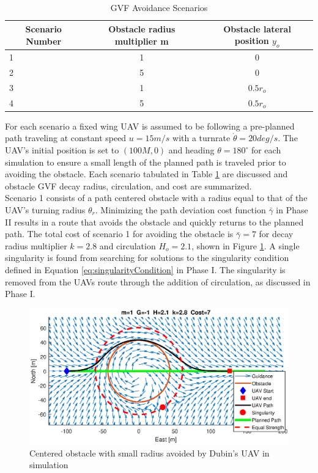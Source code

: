 \documentclass[numbered,pdftex]{ohio-etd}
\begin{document}
\begin{table}[]
	\centering
	\caption{GVF Avoidance Scenarios}
	\label{table:avoidanceScenarios}
	\begin{tabular}{|l|c|c|}
		\hline
		\multicolumn{1}{|c|}{Scenario Number} & Obstacle radius multiplier m & Obstacle lateral position $y_o$    \\ \hline
		1                                     & 1 & 0     \\ \hline
		2                                     & 5 & 0     \\ \hline
		3                                     & 1 & $0.5r_o$ \\ \hline
		4                                     & 5 & $0.5r_o$ \\ \hline
	\end{tabular}
\end{table}




For each scenario a fixed wing UAV is assumed to be following a pre-planned path traveling at constant speed $u=15m/s$ with a turnrate $\dot{\theta}=20 deg/s$. The UAV's initial position is set to $(100M,0)$ and heading $\theta = 180^\circ$ for each simulation to ensure a small length of the planned path is traveled prior to avoiding the obstacle. Each scenario tabulated in Table \ref{table:avoidanceScenarios} are discussed and obstacle GVF decay radius, circulation, and cost are summarized.\\

Scenario 1 consists of a path centered obstacle with a radius equal to that of the UAV's turning radius $\theta_r$. Minimizing the path deviation cost function  $\bar{\gamma}$ in Phase II results in a route that avoids the obstacle and quickly returns to the planned path. The total cost of scenario 1 for avoiding the obstacle is $\bar{\gamma}=7$ for decay radius multiplier $k=2.8$ and circulation $H_o = 2.1$, shown in Figure \ref{fig:m1y0solved}. A single singularity is found from searching for solutions to the singularity condition defined in Equation \ref{eq:singularityCondition} in Phase I. The singularity is removed from the UAVs route through the addition of circulation, as discussed in Phase I.

\begin{figure}[H]
	\centering
	\includegraphics[trim = 0 85 0 85, clip, width=16cm]{Figures/results/m1Y0Solved}
	\caption{Centered obstacle with small radius avoided by Dubin's UAV in simulation}
	\label{fig:m1y0solved}
\end{figure}
\end{document}
